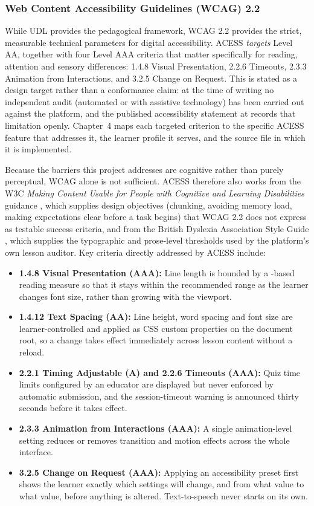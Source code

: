 \documentclass[12pt, oneside]{article} %
\newcommand{\tcode}[1]{\path{#1}}
\begin{document}
\subsubsection{Web Content Accessibility Guidelines (WCAG) 2.2}
\label{sec:wcag}
While UDL provides the pedagogical framework, WCAG 2.2 \cite{wcag22} provides the strict, measurable technical parameters for digital accessibility. ACESS \emph{targets} Level AA, together with four Level AAA criteria that matter specifically for reading, attention and sensory differences: 1.4.8 Visual Presentation, 2.2.6 Timeouts, 2.3.3 Animation from Interactions, and 3.2.5 Change on Request. This is stated as a design target rather than a conformance claim: at the time of writing no independent audit (automated or with assistive technology) has been carried out against the platform, and the published accessibility statement at \tcode{/accessibility-statement} records that limitation openly. Chapter~4 maps each targeted criterion to the specific ACESS feature that addresses it, the learner profile it serves, and the source file in which it is implemented.

Because the barriers this project addresses are cognitive rather than purely perceptual, WCAG alone is not sufficient. ACESS therefore also works from the W3C \emph{Making Content Usable for People with Cognitive and Learning Disabilities} guidance \cite{wcag_cognitive}, which supplies design objectives (chunking, avoiding memory load, making expectations clear before a task begins) that WCAG 2.2 does not express as testable success criteria, and from the British Dyslexia Association Style Guide \cite{bda_style_guide}, which supplies the typographic and prose-level thresholds used by the platform's own lesson auditor. Key criteria directly addressed by ACESS include:
\begin{itemize}
    \item \textbf{1.4.8 Visual Presentation (AAA):} Line length is bounded by a \tcode{ch}-based reading measure so that it stays within the recommended range as the learner changes font size, rather than growing with the viewport.
    \item \textbf{1.4.12 Text Spacing (AA):} Line height, word spacing and font size are learner-controlled and applied as CSS custom properties on the document root, so a change takes effect immediately across lesson content without a reload.
    \item \textbf{2.2.1 Timing Adjustable (A) and 2.2.6 Timeouts (AAA):} Quiz time limits configured by an educator are displayed but never enforced by automatic submission, and the session-timeout warning is announced thirty seconds before it takes effect.
    \item \textbf{2.3.3 Animation from Interactions (AAA):} A single animation-level setting reduces or removes transition and motion effects across the whole interface.
    \item \textbf{3.2.5 Change on Request (AAA):} Applying an accessibility preset first shows the learner exactly which settings will change, and from what value to what value, before anything is altered. Text-to-speech never starts on its own.
\end{itemize}
\end{document}
